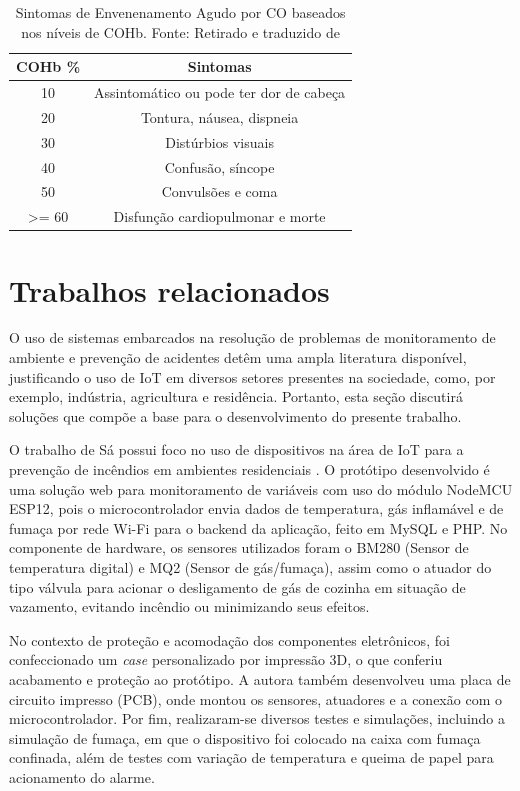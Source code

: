 \begin{table}[h!]
    \centering
    \begin{tabular}{|c|c|}
        \hline
        \textbf{COHb \%} & \textbf{Sintomas} \\
        \hline
        10 & Assintomático ou pode ter dor de cabeça \\
        \hline
        20 & Tontura, náusea, dispneia \\
        \hline
        30 & Distúrbios visuais \\
        \hline
        40 & Confusão, síncope \\
        \hline
        50 & Convulsões e coma \\
        \hline
        >= 60 & Disfunção cardiopulmonar e morte \\
        \hline
    \end{tabular}
    \caption{Sintomas de Envenenamento Agudo por CO baseados nos níveis de COHb. Fonte: Retirado e traduzido de \cite{carbon-monoxide-poisoning-varon}}
\end{table}



\section{Trabalhos relacionados}

O uso de sistemas embarcados na resolução de problemas de monitoramento de ambiente e prevenção 
de acidentes detêm uma ampla literatura disponível, justificando o uso de IoT em diversos setores 
presentes na sociedade, como, por exemplo, indústria, agricultura e residência. Portanto, esta seção 
discutirá soluções que compõe a base para o desenvolvimento do presente trabalho.

O trabalho de Sá possui foco no uso de dispositivos na área de IoT para a prevenção de incêndios em ambientes residenciais \cite{uea-iot-deteccao-incendio}. 
O protótipo desenvolvido é uma solução web para monitoramento de variáveis com uso do módulo NodeMCU ESP12, pois o microcontrolador envia dados de temperatura, gás inflamável e de 
fumaça por rede Wi-Fi para o backend da aplicação, feito em MySQL e PHP. No componente de hardware, os sensores utilizados foram o BM280 (Sensor de temperatura digital) e
MQ2 (Sensor de gás/fumaça), assim como o atuador do tipo válvula para acionar o desligamento de gás de cozinha em situação de vazamento, evitando incêndio ou minimizando seus efeitos.

No contexto de proteção e acomodação dos componentes eletrônicos, foi confeccionado um \textit{case} personalizado por impressão 3D, o que conferiu acabamento 
e proteção ao protótipo. A autora também desenvolveu uma placa de circuito impresso (PCB), onde montou os sensores, atuadores e a conexão com o microcontrolador. Por fim, realizaram-se 
diversos testes e simulações, incluindo a simulação de fumaça, em que o dispositivo foi colocado na caixa com fumaça confinada, além de testes com variação de temperatura e queima de papel para acionamento do alarme. 

